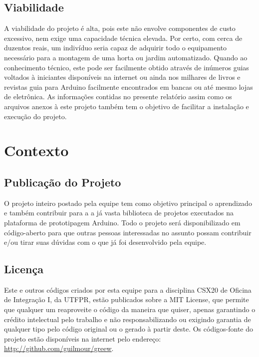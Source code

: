 \documentclass[a4paper,12pt]{article}
\begin{document}
\subsection{Viabilidade}

A viabilidade do projeto é alta, pois este não envolve componentes de custo excessivo, nem exige uma capacidade técnica elevada. Por certo, com cerca de duzentos reais, um indivíduo seria capaz de adquirir todo o equipamento necessário para a montagem de uma horta ou jardim automatizado. Quando ao conhecimento técnico, este pode ser facilmente obtido através de inúmeros guias voltados à iniciantes disponíveis na internet ou ainda nos milhares de livros e revistas guia para Arduino facilmente encontrados em bancas ou até mesmo lojas de eletrônica. As informações contidas no presente relatório assim como os arquivos anexos à este projeto também tem o objetivo de facilitar a instalação e execução do projeto.


\newpage
\section{Contexto}
\subsection{Publicação do Projeto}

O projeto inteiro postado pela equipe tem como objetivo principal o aprendizado e também contribuir para a a já vasta biblioteca de projetos executados na plataforma de prototipagem Arduino. Todo o projeto será disponibilizado em código-aberto para que outras pessoas interessadas no assunto possam contribuir e/ou tirar suas dúvidas com o que já foi desenvolvido pela equipe. 

\subsection{Licença}

Este e outros códigos criados por esta equipe para a disciplina CSX20 de Oficina de Integração I, da UTFPR, estão publicados sobre a MIT License, que permite que qualquer um reaproveite o código da maneira que quiser, apenas garantindo o crédito intelectual pelo trabalho e não responsabilizando ou exigindo garantia de qualquer tipo pelo código original ou o gerado à partir deste. Os códigos-fonte do projeto estão disponíveis na internet pelo endereço: \href{http://github.com/guilmour/greew}{http://github.com/guilmour/greew}.
\end{document}
